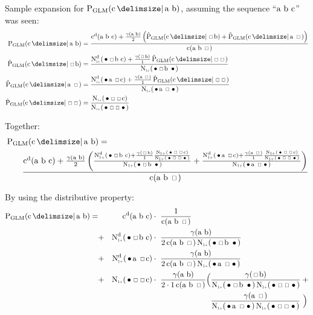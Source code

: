\newcommand{\ProbGLMcab}[2]
  {\frac{\DiscountedCount(\text{a b c}) + \frac{\gamma(\text{a b})}{2}\left(#1 + #2\right)}{\Count(\text{a b \Skp})}}
\newcommand{\ProbGLMcsb}[1]
  {\frac{\DiscountedCount*(\text{\WSkp \Skp b c}) + \frac{\gamma(\text{\Skp b})}{1} #1}{\ContCountIp(\text{\WSkp \Skp b \WSkp})}}
\newcommand{\ProbGLMcas}[1]
  {\frac{\DiscountedCount*(\text{\WSkp a \Skp c}) + \frac{\gamma(\text{a \Skp})}{1} #1}{\ContCountIp(\text{\WSkp a \Skp \WSkp})}}
\newcommand{\ProbGLMcss}
  {\frac{\ContCountIp(\text{\WSkp \Skp \Skp c})}{\ContCountIp(\text{\WSkp \Skp \Skp \WSkp})}}

Sample expansion for $\ProbGLM{\text{c}}{\text{a b}}$, assuming the sequence
``$\text{\text{a b c}}$'' was seen:
\begin{align}
  \ProbGLM {\text{c}}{\text{a b}}       &= \ProbGLMcab{\ProbGLM*{\text{c}}{\text{\Skp b}}}{\ProbGLM*{\text{c}}{\text{a \Skp}}} \\ \ProbGLM*{\text{c}}{\text{\Skp b}}    &= \ProbGLMcsb{\ProbGLM*{\text{c}}{\text{\Skp \Skp}}} \\
  \ProbGLM*{\text{c}}{\text{a \Skp}}    &= \ProbGLMcas{\ProbGLM*{\text{c}}{\text{\Skp \Skp}}} \\
  \ProbGLM*{\text{c}}{\text{\Skp \Skp}} &= \ProbGLMcss
\end{align}

\noindent
Together:
\begin{align}
  &\ProbGLM{\text{c}}{\text{a b}} =\\
  &\qquad \ProbGLMcab{\ProbGLMcsb{\ProbGLMcss}}
                     {\ProbGLMcas{\ProbGLMcss}} \nonumber
\end{align}

\noindent
By using the distributive property:
\begin{align}
  \ProbGLM {\text{c}}{\text{a b}} =
    & & \DiscountedCount (\text{a b c})          &             \cdot\  \frac{1}{\Count(\text{a b \Skp})} \\
    &+& \DiscountedCount*(\text{\WSkp \Skp b c}) &             \cdot\  \frac{\gamma(\text{a b})}{2 \Count(\text{a b \Skp}) \ContCountIp(\text{\WSkp \Skp b \WSkp})} \nonumber \\
    &+& \DiscountedCount*(\text{\WSkp a \Skp c}) &             \cdot\  \frac{\gamma(\text{a b})}{2 \Count(\text{a b \Skp}) \ContCountIp(\text{\WSkp a \Skp \WSkp})} \nonumber \\
    &+& \ContCountIp(\text{\WSkp\Skp \Skp c})    &             \cdot\  \frac{\gamma(\text{a b})}{2 \cdot 1 \Count(\text{a b \Skp})} \Big(  \frac{\gamma(\text{\Skp b})}{\ContCountIp(\text{\WSkp \Skp b \WSkp}) \ContCountIp(\text{\WSkp \Skp \Skp \WSkp})} \: + \nonumber \\
    & &                                          & \phantom{{} \cdot\  \frac{\gamma(\text{a b})}{2 \cdot 1 \Count(\text{a b \Skp})} \Big(} \frac{\gamma(\text{a \Skp})}{\ContCountIp(\text{\WSkp a \Skp \WSkp}) \ContCountIp(\text{\WSkp \Skp \Skp \WSkp})} \ \Big) \nonumber
\end{align}
